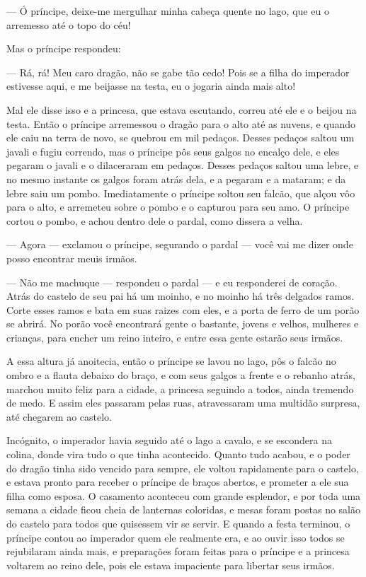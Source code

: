 — Ó príncipe, deixe-me mergulhar minha cabeça quente no lago, que eu o
arremesso até o topo do céu!

Mas o príncipe respondeu:

— Rá, rá! Meu caro dragão, não se gabe tão cedo! Pois se a filha do
imperador estivesse aqui, e me beijasse na testa, eu o jogaria ainda
mais alto!

Mal ele disse isso e a princesa, que estava escutando, correu até ele
e o beijou na testa. Então o príncipe arremessou o dragão para o alto
até as nuvens, e quando ele caiu na terra de novo, se quebrou em mil
pedaços. Desses pedaços saltou um javali e fugiu correndo, mas o
príncipe pôs seus galgos no encalço dele, e eles pegaram o javali e o
dilaceraram em pedaços. Desses pedaços saltou uma lebre, e no mesmo
instante os galgos foram atrás dela, e a pegaram e a mataram; e da
lebre saiu um pombo. Imediatamente o príncipe soltou seu falcão, que
alçou vôo para o alto, e arremeteu sobre o pombo e o capturou para
seu amo. O príncipe cortou o pombo, e achou dentro dele o pardal,
como dissera a velha.

— Agora — exclamou o príncipe, segurando o pardal — você vai me dizer
onde posso encontrar meuis irmãos.

— Não me machuque — respondeu o pardal — e eu responderei de coração.
Atrás do castelo de seu pai há um moinho, e no moinho há três
delgados ramos. Corte esses ramos e bata em suas raizes com eles, e a
porta de ferro de um porão se abrirá. No porão você encontrará gente
o bastante, jovens e velhos, mulheres e crianças, para encher um
reino inteiro, e entre essa gente estarão seus irmãos.

A essa altura já anoitecia, então o príncipe se lavou no lago, pôs o
falcão no ombro e a flauta debaixo do braço, e com seus galgos a
frente e o rebanho atrás, marchou muito feliz para a cidade, a
princesa seguindo a todos, ainda tremendo de medo. E assim eles
passaram pelas ruas, atravessaram uma multidão surpresa, até chegarem
ao castelo.

Incógnito, o imperador havia seguido até o lago a cavalo, e se
escondera na colina, donde vira tudo o que tinha acontecido. Quanto
tudo acabou, e o poder do dragão tinha sido vencido para sempre, ele
voltou rapidamente para o castelo, e estava pronto para receber o
príncipe de braços abertos, e prometer a ele sua filha como esposa. O
casamento aconteceu com grande esplendor, e por toda uma semana a
cidade ficou cheia de lanternas coloridas, e mesas foram postas no
salão do castelo para todos que quisessem vir se servir. E quando a
festa terminou, o príncipe contou ao imperador quem ele realmente
era, e ao ouvir isso todos se rejubilaram ainda mais, e preparações
foram feitas para o príncipe e a princesa voltarem ao reino dele,
pois ele estava impaciente para libertar seus irmãos.

